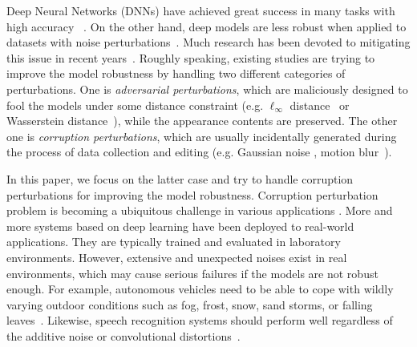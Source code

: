 \documentclass[letterpaper]{article} %
\begin{document}
Deep Neural Networks (DNNs) have achieved great success in many tasks with high accuracy ~\cite{krizhevsky2012imagenet, he2015delving, sutskever2014sequence,silver2017mastering}. On the other hand, deep models are less robust when applied to datasets with noise perturbations~\cite{szegedy2013intriguing, alzantot2018generating, hendrycks2019robustness}. Much research has been devoted to mitigating this issue in recent years~\cite{geirhos2018imagenet, rusak2020increasing, tramer2020adaptive, hendrycks2019using, mao2019metric, hendrycks2019augmix, zhang2019making}. Roughly speaking, existing studies are trying to improve the model robustness by handling two different categories of perturbations. One is \textit{adversarial perturbations}, which are maliciously designed to fool the models under some distance constraint (e.g. $\ell_{\infty}$ distance~\cite{madry2017towards} or Wasserstein distance~\cite{wong2019wasserstein}), while the appearance contents are preserved. The other one is \textit{corruption perturbations}, which are usually incidentally generated during the process of data collection and editing (e.g. Gaussian noise \cite{chapelle2001vicinal}, motion blur~\cite{hendrycks2019robustness}).

In this paper, we focus on the latter case and try to handle corruption perturbations for improving the model robustness. Corruption perturbation problem is becoming a ubiquitous challenge in various applications \cite{hendrycks2019robustness, michaelis2019benchmarking}.
More and more systems based on deep learning have been deployed to real-world applications. They are typically trained and evaluated in laboratory environments. However, extensive and unexpected noises exist in real environments, which may cause serious failures if the models are not robust enough.
For example, autonomous vehicles need to be able to cope with wildly varying outdoor conditions such as fog, frost, snow, sand storms, or falling leaves~\cite{michaelis2019benchmarking}. Likewise, speech recognition systems should perform well regardless of the additive noise or convolutional distortions~\cite{qian2016very}.
\end{document}
